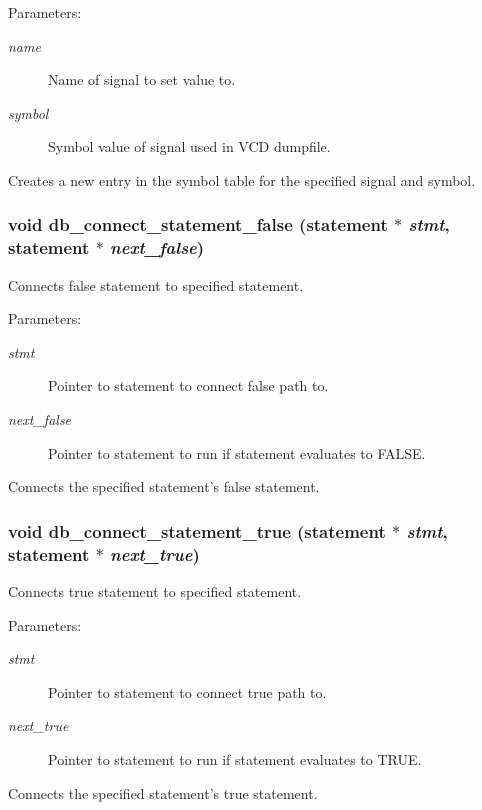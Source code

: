 \begin{Desc}
\item[Parameters: ]\par
\begin{description}
\item[{\em 
name}]Name of signal to set value to. \item[{\em 
symbol}]Symbol value of signal used in VCD dumpfile.\end{description}
\end{Desc}
Creates a new entry in the symbol table for the specified signal and symbol. 
\subsubsection{\setlength{\rightskip}{0pt plus 5cm}void db\_\-connect\_\-statement\_\-false ({\bf statement} $\ast$ {\em stmt}, {\bf statement} $\ast$ {\em next\_\-false})}\label{db_8h_a13}


Connects false statement to specified statement.

\begin{Desc}
\item[Parameters: ]\par
\begin{description}
\item[{\em 
stmt}]Pointer to statement to connect false path to. \item[{\em 
next\_\-false}]Pointer to statement to run if statement evaluates to FALSE.\end{description}
\end{Desc}
Connects the specified statement's false statement. 
\subsubsection{\setlength{\rightskip}{0pt plus 5cm}void db\_\-connect\_\-statement\_\-true ({\bf statement} $\ast$ {\em stmt}, {\bf statement} $\ast$ {\em next\_\-true})}\label{db_8h_a12}


Connects true statement to specified statement.

\begin{Desc}
\item[Parameters: ]\par
\begin{description}
\item[{\em 
stmt}]Pointer to statement to connect true path to. \item[{\em 
next\_\-true}]Pointer to statement to run if statement evaluates to TRUE.\end{description}
\end{Desc}
Connects the specified statement's true statement. 
